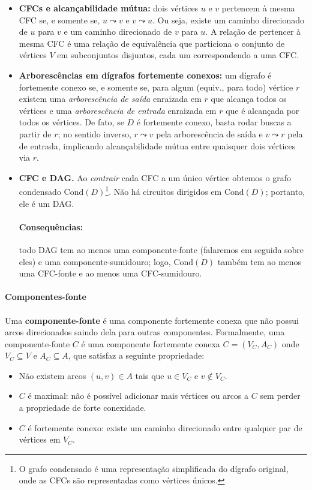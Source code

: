 \documentclass[12pt,a4paper]{article}
\begin{document}
\begin{itemize}
    \item \textbf{CFCs e alcançabilidade mútua:} dois vértices \(u\) e \(v\) pertencem à mesma CFC se, e somente se, \(u\leadsto v\) e \(v\leadsto u\). Ou seja, existe um caminho direcionado de \(u\) para \(v\) e um caminho direcionado de \(v\) para \(u\). A relação de pertencer à mesma CFC é uma relação de equivalência que particiona o conjunto de vértices \(V\) em subconjuntos disjuntos, cada um correspondendo a uma CFC.
    \item \textbf{Arborescências em dígrafos fortemente conexos:} um dígrafo é fortemente conexo se, e somente se, para algum (equiv., para todo) vértice $r$ existem uma \emph{arborescência de saída} enraizada em $r$ que alcança todos os vértices e uma \emph{arborescência de entrada} enraizada em $r$ que é alcançada por todos os vértices. De fato, se $D$ é fortemente conexo, basta rodar buscas a partir de $r$; no sentido inverso, $r\leadsto v$ pela arborescência de saída e $v\leadsto r$ pela de entrada, implicando alcançabilidade mútua entre quaisquer dois vértices via $r$.
    \item \textbf{CFC e DAG.} Ao \emph{contrair} cada CFC a um único vértice obtemos o grafo condensado $\mathrm{Cond}(D)$\footnote{O grafo condensado é uma representação simplificada do dígrafo original, onde as CFCs são representadas como vértices únicos.}. Não há circuitos dirigidos em $\mathrm{Cond}(D)$; portanto, ele é um DAG.
    
    \paragraph{Consequências:}
     todo DAG tem ao menos uma componente-fonte (falaremos em seguida sobre eles) e uma componente-sumidouro; logo, $\mathrm{Cond}(D)$ também tem ao menos uma CFC-fonte e ao menos uma CFC-sumidouro.
\end{itemize}

\paragraph{Componentes-fonte}
\paragraph{}Uma \textbf{componente-fonte} é uma componente fortemente conexa que não possui arcos direcionados saindo dela para outras componentes. Formalmente, uma componente-fonte \(C\) é uma componente fortemente conexa \(C = (V_C, A_C)\) onde \(V_C \subseteq V\) e \(A_C \subseteq A\), que satisfaz a seguinte propriedade:
\begin{itemize}
    \item Não existem arcos \((u, v) \in A\) tais que \(u \in V_C\) e \(v \notin V_C\).
    \item \(C\) é maximal: não é possível adicionar mais vértices ou arcos a \(C\) sem perder a propriedade de forte conexidade.
    \item \(C\) é fortemente conexo: existe um caminho direcionado entre qualquer par de vértices em \(V_C\).
\end{itemize}
\end{document}
